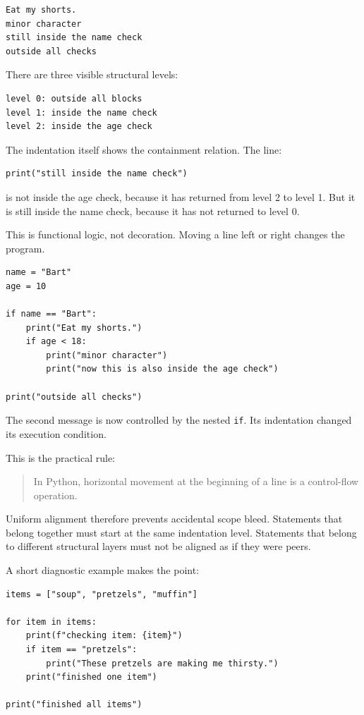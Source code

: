 \begin{verbatim}
Eat my shorts.
minor character
still inside the name check
outside all checks
\end{verbatim}

There are three visible structural levels:

\begin{verbatim}
level 0: outside all blocks
level 1: inside the name check
level 2: inside the age check
\end{verbatim}

The indentation itself shows the containment relation. The line:

\begin{verbatim}
print("still inside the name check")
\end{verbatim}

is not inside the age check, because it has returned from level 2 to level 1. But it is still inside the name check, because it has not returned to level 0.

This is functional logic, not decoration. Moving a line left or right changes the program.

\begin{verbatim}
name = "Bart"
age = 10

if name == "Bart":
    print("Eat my shorts.")
    if age < 18:
        print("minor character")
        print("now this is also inside the age check")

print("outside all checks")
\end{verbatim}

The second message is now controlled by the nested \texttt{if}. Its indentation changed its execution condition.

This is the practical rule:

\begin{quote}
In Python, horizontal movement at the beginning of a line is a control-flow operation.
\end{quote}

Uniform alignment therefore prevents accidental scope bleed. Statements that belong together must start at the same indentation level. Statements that belong to different structural layers must not be aligned as if they were peers.

A short diagnostic example makes the point:

\begin{verbatim}
items = ["soup", "pretzels", "muffin"]

for item in items:
    print(f"checking item: {item}")
    if item == "pretzels":
        print("These pretzels are making me thirsty.")
    print("finished one item")

print("finished all items")
\end{verbatim}

